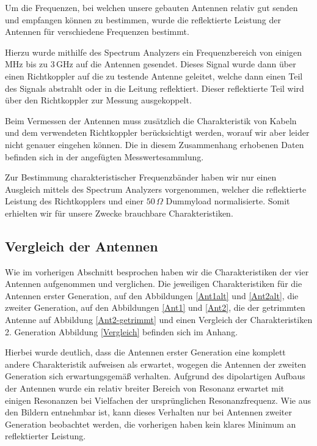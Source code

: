 \documentclass[titlepage,11pt,a4paper,ngerman]{article}
\begin{document}
Um die Frequenzen, bei welchen unsere gebauten Antennen relativ gut senden und empfangen können zu bestimmen, wurde die reflektierte Leistung der Antennen für verschiedene Frequenzen bestimmt.\par
Hierzu wurde mithilfe des Spectrum Analyzers ein Frequenzbereich von einigen MHz bis zu $3\,$GHz auf die Antennen gesendet. Dieses Signal wurde dann über einen Richtkoppler auf die zu testende Antenne geleitet, welche dann einen Teil des Signals abstrahlt oder in die Leitung reflektiert. Dieser reflektierte Teil wird über den Richtkoppler zur Messung ausgekoppelt.\par
Beim Vermessen der Antennen muss zusätzlich die Charakteristik von Kabeln und dem verwendeten Richtkoppler berücksichtigt werden, worauf wir aber leider nicht genauer eingehen können. Die in diesem Zusammenhang erhobenen Daten befinden sich in der angefügten Messwertesammlung.\par
Zur Bestimmung charakteristischer Frequenzbänder haben wir nur einen Ausgleich mittels des Spectrum Analyzers vorgenommen, welcher die reflektierte Leistung des Richtkopplers und einer $50\,\Omega$  Dummyload normalisierte. Somit erhielten wir für unsere Zwecke brauchbare Charakteristiken.

\subsection{Vergleich der Antennen}

Wie im vorherigen Abschnitt besprochen haben wir die Charakteristiken der vier Antennen aufgenommen und verglichen.  Die jeweiligen Charakteristiken für die Antennen erster Generation, auf den Abbildungen \ref{Ant1alt} und \ref{Ant2alt}, die zweiter Generation, auf den Abbildungen \ref{Ant1} und \ref{Ant2}, die der getrimmten Antenne auf Abbildung \ref{Ant2-getrimmt} und einen Vergleich der Charakteristiken 2. Generation Abbildung \ref{Vergleich} befinden sich im Anhang.\par
Hierbei wurde deutlich, dass die Antennen erster Generation eine komplett andere Charakteristik aufweisen als erwartet, wogegen die Antennen der zweiten Generation sich erwartungsgemäß verhalten. Aufgrund des dipolartigen Aufbaus der Antennen wurde ein relativ breiter Bereich von Resonanz erwartet mit einigen Resonanzen bei Vielfachen der ursprünglichen Resonanzfrequenz. Wie aus den Bildern entnehmbar ist, kann dieses Verhalten nur bei Antennen zweiter Generation beobachtet werden, die vorherigen haben kein klares Minimum an reflektierter Leistung.
\end{document}
